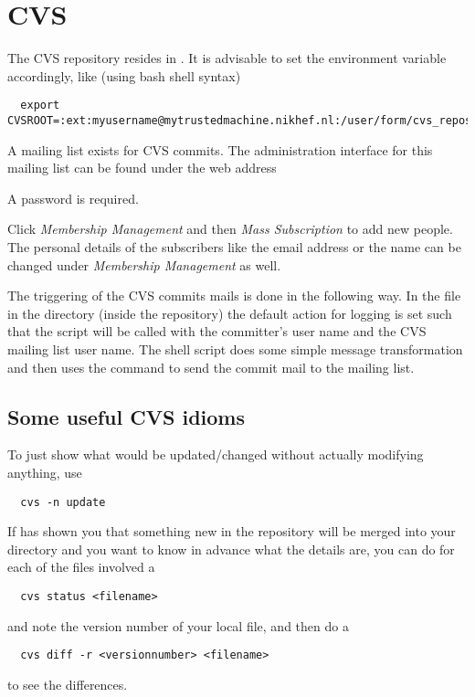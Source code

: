 \section{CVS}

The CVS repository resides in . It is advisable to
set the environment variable  accordingly, like (using bash shell syntax)
{\scriptsize
\begin{verbatim}
  export CVSROOT=:ext:myusername@mytrustedmachine.nikhef.nl:/user/form/cvs_repository
\end{verbatim}}

A mailing list exists for CVS commits. The administration interface for this mailing list can be
found under the web address


A password is required. 

Click {\it Membership Management} and then {\it Mass Subscription} to add
new people. The personal details of the subscribers like the email address or
the name can be changed under {\it Membership Management} as well.

The triggering of the CVS commits mails is done in the following way. In the
file  in the directory  (inside the repository) the
default action for logging is set such that the script 
will be called with the committer's user name and the CVS mailing list user
name. The shell script does some simple message transformation and then uses the
command  to send the commit mail to the mailing list.

\subsection{Some useful CVS idioms}

To just show what would be updated/changed without actually
modifying anything, use
\begin{verbatim}
  cvs -n update
\end{verbatim}

If  has shown you that something new in the repository will be
merged into your directory and you want to know in advance what the details are,
you can do for each of the files involved a
\begin{verbatim}
  cvs status <filename>
\end{verbatim}
and note the version number of your local file, and then do a
\begin{verbatim}
  cvs diff -r <versionnumber> <filename>
\end{verbatim}
to see the differences.

